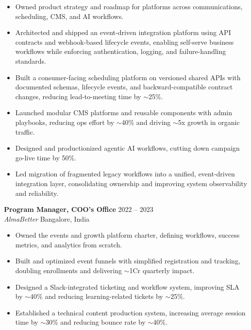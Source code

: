 \documentclass[10pt, a4paper]{article}
\begin{document}
\begin{itemize}[leftmargin=1.2em, labelsep=0.4em, itemsep=0.2em, topsep=0.4em, parsep=0em]
    \item {\small Owned product strategy and roadmap for platforms across communications, scheduling, CMS, and AI workflows.}
    \item {\small Architected and shipped an event-driven integration platform using API contracts and webhook-based lifecycle events, enabling self-serve business workflows while enforcing authentication, logging, and failure-handling standards.}
    \item {\small Built a consumer-facing scheduling platform on versioned shared APIs with documented schemas, lifecycle events, and backward-compatible contract changes, reducing lead-to-meeting time by $\sim$25\%.}
    \item {\small Launched modular CMS platforms and reusable components with admin playbooks, reducing ops effort by $\sim$40\% and driving $\sim$5x growth in organic traffic.}
    \item {\small Designed and productionized agentic AI workflows, cutting down campaign go-live time by 50\%.}
    \item {\small Led migration of fragmented legacy workflows into a unified, event-driven integration layer, consolidating ownership and improving system observability and reliability.}
\end{itemize}

\vspace{0.2em}

{\small \textbf{Program Manager, COO's Office} \hfill 2022 -- 2023 \\
\textit{AlmaBetter} \hfill Bangalore, India}

\begin{itemize}[leftmargin=1.2em, labelsep=0.4em, itemsep=0.2em, topsep=0.4em, parsep=0em]
    \item {\small Owned the events and growth platform charter, defining workflows, success metrics, and analytics from scratch.}
    \item {\small Built and optimized event funnels with simplified registration and tracking, doubling enrollments and delivering $\sim$1Cr quarterly impact.}
    \item {\small Designed a Slack-integrated ticketing and workflow system, improving SLA by $\sim$40\% and reducing learning-related tickets by $\sim$25\%.}
    \item {\small Established a technical content production system, increasing average session time by $\sim$30\% and reducing bounce rate by $\sim$40\%.}
\end{itemize}
\end{document}
